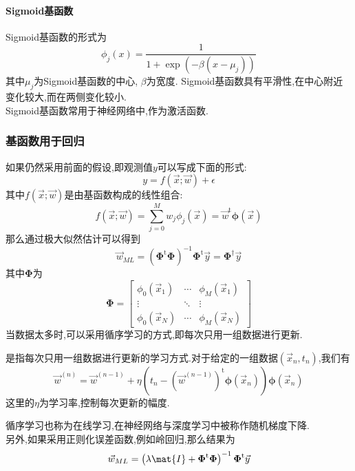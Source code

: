 \documentclass{ctexart}
\begin{document}
\paragraph{Sigmoid基函数}
Sigmoid基函数的形式为
\[\phi_j\left(x\right)=\dfrac{1}{1+\exp\left(-\beta\left(x-\mu_j\right)\right)}\]
其中$\mu_j$为Sigmoid基函数的中心, $\beta$为宽度. Sigmoid基函数具有平滑性,在中心附近变化较大,而在两侧变化较小.\\
\indent Sigmoid基函数常用于神经网络中,作为激活函数.
\subsubsection{基函数用于回归}
如果仍然采用前面的假设,即观测值$y$可以写成下面的形式:
\[y=f(\vec{x};\vec{w})+\epsilon\]
其中$f(\vec{x};\vec{w})$是由基函数构成的线性组合:
\[f(\vec{x};\vec{w})=\sum_{j=0}^{M}w_j\phi_j\left(\vec{x}\right)=\vec{w}^{\text{t}}\boldsymbol{\phi}\left(\vec{x}\right)\]
那么通过极大似然估计可以得到
\[\vec{w}_{ML}=\left(\boldsymbol{\Phi}^{\text{t}}\boldsymbol{\Phi}\right)^{-1}\boldsymbol{\Phi}^{\text{t}}\vec{y}=\boldsymbol{\Phi}^{\dagger}\vec{y}\]
其中$\boldsymbol{\Phi}$为
\[\boldsymbol{\Phi}=\begin{bmatrix}
    \phi_0\left(\vec{x}_1\right) & \cdots & \phi_M\left(\vec{x}_1\right) \\
    \vdots & \ddots & \vdots \\
    \phi_0\left(\vec{x}_N\right) & \cdots & \phi_M\left(\vec{x}_N\right)
\end{bmatrix}\]
当数据太多时,可以采用循序学习的方式,即每次只用一组数据进行更新.
\begin{definition}[循序学习]
    是指每次只用一组数据进行更新的学习方式.对于给定的一组数据$(\vec{x}_n,t_n)$,我们有
    \[\vec{w}^{(n)}=\vec{w}^{(n-1)}+\eta\left(t_n-\left(\vec{w}^{(n-1)}\right)^\text{t}\boldsymbol{\phi}\left(\vec{x}_n\right)\right)\boldsymbol{\phi}\left(\vec{x}_n\right)\]
    这里的$\eta$为学习率,控制每次更新的幅度.
\end{definition}
循序学习也称为在线学习,在神经网络与深度学习中被称作随机梯度下降.\\
\indent 另外,如果采用正则化误差函数,例如岭回归,那么结果为
\[\vec{w}_{ML}=\left(\lambda\mat{I}+\boldsymbol{\Phi}^{\text{t}}\boldsymbol{\Phi}\right)^{-1}\boldsymbol{\Phi}^{\text{t}}\vec{y}\]
\end{document}
